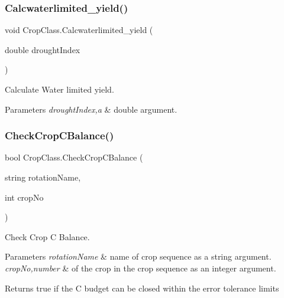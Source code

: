 \subsubsection{\texorpdfstring{Calcwaterlimited\_yield()}{Calcwaterlimited\_yield()}}
{\footnotesize\ttfamily void Crop\+Class.\+Calcwaterlimited\+\_\+yield (\begin{DoxyParamCaption}\item[{double}]{drought\+Index }\end{DoxyParamCaption})\hspace{0.3cm}{\ttfamily [inline]}}



Calculate Water limited yield. 


\begin{DoxyParams}{Parameters}
{\em drought\+Index,a} & double argument. \\
\hline
\end{DoxyParams}
\mbox{\label{class_crop_class_adaf339a54eea1a6f2682cefde6a68f01}} 
\subsubsection{\texorpdfstring{CheckCropCBalance()}{CheckCropCBalance()}}
{\footnotesize\ttfamily bool Crop\+Class.\+Check\+Crop\+C\+Balance (\begin{DoxyParamCaption}\item[{string}]{rotation\+Name,  }\item[{int}]{crop\+No }\end{DoxyParamCaption})\hspace{0.3cm}{\ttfamily [inline]}}



Check Crop C Balance. 


\begin{DoxyParams}{Parameters}
{\em rotation\+Name} & name of crop sequence as a string argument. \\
\hline
{\em crop\+No,number} & of the crop in the crop sequence as an integer argument. \\
\hline
\end{DoxyParams}
\begin{DoxyReturn}{Returns}
true if the C budget can be closed within the error tolerance limits 
\end{DoxyReturn}
\mbox{\label{class_crop_class_a46553cb55d0d0226d8466727d9cc13a1}} 
